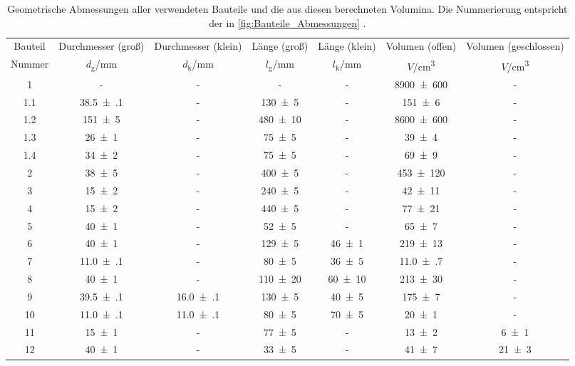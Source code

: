 \begin{table}[!h]
	\centering
	\begin{adjustbox}{width=\textwidth}
	\begin{tabular}{ccccccc}
		\toprule
		Bauteil & Durchmesser (groß) & Durchmesser (klein) & Länge (groß) & Länge (klein) & Volumen (offen) & Volumen (geschlossen)\\
		Nummer & $d_\mathrm{g}$/\si{mm} & $d_\mathrm{k}$/\si{mm} & $l_\mathrm{g}$/\si{mm} & $l_\mathrm{k}$/\si{mm} & $V$/\si{cm\cubed} & $V$/\si{cm\cubed}\\
\midrule
		\num{1} & - & - & - & - & \num{8900(600)} & -\\
		1.1 & \num{38.5(1)} & - & \num{130(5)} & - & \num{151(6)} & -\\
		1.2 & \num{151(5)} & - & \num{480(10)} & - & \num{8600(600)} & -\\
		1.3 & \num{26(1)} & - & \num{75(5)} & - & \num{39(4)} & -\\
		1.4 & \num{34(2)} & - & \num{75(5)} & - & \num{69(9)} & -\\
		2 & \num{38(5)} & - & \num{400(5)} & - & \num{453(120)} & -\\
		3 & \num{15(2)} & - & \num{240(5)} & - & \num{42(11)} & -\\
		4 & \num{15(2)} & - & \num{440(5)} & - & \num{77(21)} & -\\
		5 & \num{40(1)} & - & \num{52(5)} & - & \num{65(7)} & -\\
		6 & \num{40(1)} & - & \num{129(5)} & \num{46(1)} & \num{219(13)} & -\\
		7 & \num{11.0(1)} & - & \num{80(5)} & \num{36(5)} & \num{11.0(7)} & -\\
		8 & \num{40(1)} & - & \num{110(20)} & \num{60(10)} & \num{213(30)} & -\\
		9 & \num{39.5(1)} & \num{16.0(1)} & \num{130(5)} & \num{40(5)} & \num{175(7)} & -\\
		10 & \num{11.0(1)} & \num{11.0(1)} & \num{80(5)} & \num{70(5)} & \num{20(1)} & -\\
		11 & \num{15(1)} & - & \num{77(5)} & - & \num{13(2)} & \num{6(1)}\\
		12 & \num{40(1)} & - & \num{33(5)} & - & \num{41(7)} & \num{21(3)}\\
		\bottomrule

	\end{tabular}
	\end{adjustbox}
	\caption{Geometrische Abmessungen aller verwendeten Bauteile und die aus diesen berechneten Volumina.
                  Die Nummerierung entspricht der in \cref{fig:Bauteile_Abmessungen} . \label{tab:Bauteile_Abmessungen}}
\end{table}
